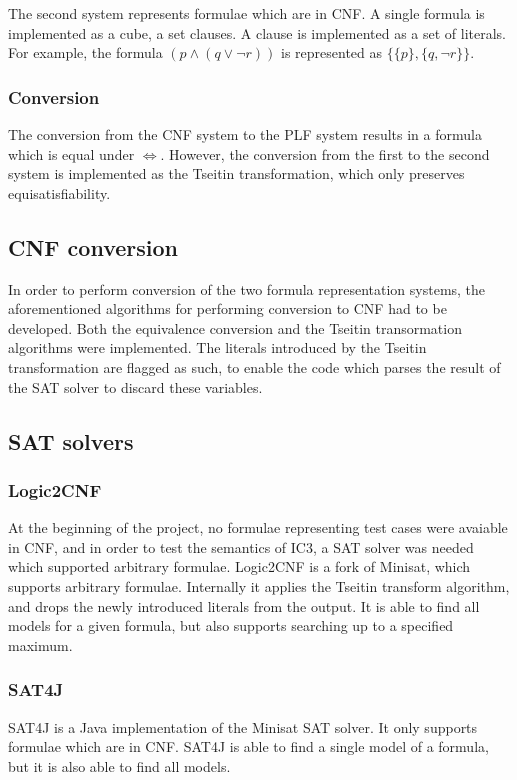 \documentclass[a4paper]{article}
\begin{document}
The second system represents formulae which are in CNF. A single formula is implemented as a cube, a set clauses. A clause is implemented as a set of literals. For example, the formula $(p \land (q \lor \lnot r))$ is represented as $\{\{p\},\{q,\lnot r\}\}$.
\subsubsection{Conversion}
The conversion from the CNF system to the PLF system results in a formula which is equal under $\Leftrightarrow$. However, the conversion from the first to the second system is implemented as the Tseitin transformation, which only preserves equisatisfiability.

\subsection{CNF conversion}
In order to perform conversion of the two formula representation systems, the aforementioned algorithms for performing conversion to CNF had to be developed. Both the equivalence conversion and the Tseitin transormation algorithms were implemented.  The literals introduced by the Tseitin transformation are flagged as such, to enable the code which parses the result of the SAT solver to discard these variables.

\subsection{SAT solvers}
\subsubsection{Logic2CNF}
At the beginning of the project, no formulae representing test cases were avaiable in CNF, and in order to test the semantics of IC3, a SAT solver was needed which supported arbitrary formulae. Logic2CNF is a fork of Minisat, which supports arbitrary formulae. Internally it applies the Tseitin transform algorithm, and drops the newly introduced literals from the output. It is able to find all models for a given formula, but also supports searching up to a specified maximum.

\subsubsection{SAT4J}
SAT4J is a Java implementation of the Minisat SAT solver. It only supports formulae which are in CNF. SAT4J is able to find a single model of a formula, but it is also able to find all models.
\end{document}
